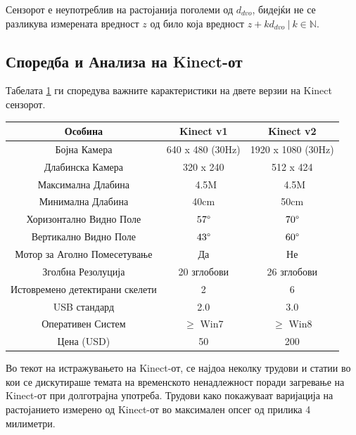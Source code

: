 \documentclass[12pt]{article}
\begin{document}
		Сензорот е неупотреблив на растојанија поголеми од $d_{dvo}$, бидејќи не се разликува измерената вредност $z$ од било која вредност $z + k d_{dvo}\ | \ k \in \mathbb{N}$.

  \subsection{Споредба и Анализа на Kinect-от}
    Табелата \ref{tab:comparison} ги споредува важните карактеристики на двете верзии на Kinect сензорот.
    \begin{table}[H]
      \centering
      \label{tab:comparison}
      \begin{tabular}{||c|c|c||}
        \hline
        Особина & Kinect v1 & Kinect v2 \\
        \hline
        Бојна Камера & 640 x 480 (30Hz) & 1920 x 1080 (30Hz) \\
        \hline
        Длабинска Камера & 320 x 240 & 512 x 424 \\
        \hline
        Максимална Длабина & ~4.5M & ~4.5M \\
        \hline
        Минимална Длабина & 40cm & 50cm \\
        \hline
        Хоризонтално Видно Поле & $57\degree$ & $70\degree$ \\
        \hline
        Вертикално Видно Поле & $43\degree$ & $60\degree$ \\
        \hline
        Мотор за Аголно Помесетување & Да & Не \\
        \hline
        Зголбна Резолуција & 20 зглобови & 26 зглобови \\
        \hline
        Истовремено детектирани скелети &  2 & 6 \\
        \hline
        USB стандард & 2.0 & 3.0 \\
        \hline
        Оперативен Систем & $\geq$ Win7 & $\geq$ Win8 \\
        \hline
        Цена (USD) & 50 & 200 \\
        \hline
      \end{tabular}
      \end{table}
    Во текот на истражувањето на Kinect-от, се најдоа неколку трудови и статии во кои се дискутираше темата на временското ненадлежност поради загревање на Kinect-от при долготрајна употреба. Трудови како \cite{heatup} покажуваат варијација на растојанието измерено од Kinect-от во максимален опсег од прилика 4 милиметри.
\end{document}
